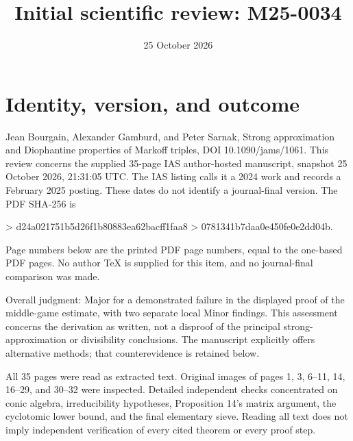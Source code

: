 \documentclass[10pt]{article}
\title{Initial scientific review: M25-0034}
\author{}
\date{25 October 2026}
\begin{document}
\maketitle
\section*{Identity, version, and outcome}
Jean Bourgain, Alexander Gamburd, and Peter Sarnak, Strong approximation and Diophantine properties of Markoff triples, DOI 10.1090/jams/1061. This review concerns the supplied 35-page IAS author-hosted manuscript, snapshot 25 October 2026, 21:31:05 UTC. The IAS listing calls it a 2024 work and records a February 2025 posting. These dates do not identify a journal-final version. The PDF SHA-256 is\par
> d24a021751b5d26f1b80883ea62bacff1faa8
> 0781341b7daa0e450fe0e2dd04b.\par
Page numbers below are the printed PDF page numbers, equal to the one-based PDF pages. No author TeX is supplied for this item, and no journal-final comparison was made.\par
Overall judgment: Major for a demonstrated failure in the displayed proof of the middle-game estimate, with two separate local Minor findings. This assessment concerns the derivation as written, not a disproof of the principal strong-approximation or divisibility conclusions. The manuscript explicitly offers alternative methods; that counterevidence is retained below.\par
All 35 pages were read as extracted text. Original images of pages 1, 3, 6–11, 14, 16–29, and 30–32 were inspected. Detailed independent checks concentrated on conic algebra, irreducibility hypotheses, Proposition 14’s matrix argument, the cyclotomic lower bound, and the final elementary sieve. Reading all text does not imply independent verification of every cited theorem or every proof step.\par
\end{document}
